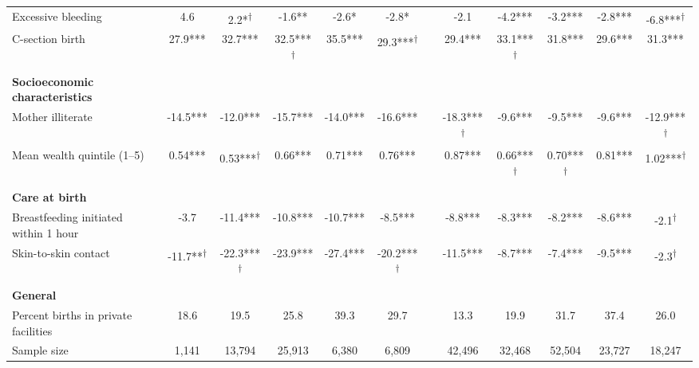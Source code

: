 \begin{tabular}{l*{5}{c}@{\hspace{1.4em}}c@{\hspace{1.4em}}*{5}{c}}
\hspace*{2em}Excessive bleeding&4.6&2.2*\textsuperscript{\(\dagger\)}&-1.6**&-2.6*&-2.8*&&-2.1&-4.2***&-3.2***&-2.8***&-6.8***\textsuperscript{\(\dagger\)}\\
\hspace*{2em}C-section birth&27.9***&32.7***&32.5***\textsuperscript{\(\dagger\)}&35.5***&29.3***\textsuperscript{\(\dagger\)}&&29.4***&33.1***\textsuperscript{\(\dagger\)}&31.8***&29.6***&31.3***\\
&&&&&&&&&&&\\
\textbf{Socioeconomic characteristics}&&&&&&&&&&&\\
\hspace*{2em}Mother illiterate&-14.5***&-12.0***&-15.7***&-14.0***&-16.6***&&-18.3***\textsuperscript{\(\dagger\)}&-9.6***&-9.5***&-9.6***&-12.9***\textsuperscript{\(\dagger\)}\\
\hspace*{2em}Mean wealth quintile (1--5)&0.54***&0.53***\textsuperscript{\(\dagger\)}&0.66***&0.71***&0.76***&&0.87***&0.66***\textsuperscript{\(\dagger\)}&0.70***\textsuperscript{\(\dagger\)}&0.81***&1.02***\textsuperscript{\(\dagger\)}\\
&&&&&&&&&&&\\
\textbf{Care at birth}&&&&&&&&&&&\\
\hspace*{2em}Breastfeeding initiated within 1 hour&-3.7&-11.4***&-10.8***&-10.7***&-8.5***&&-8.8***&-8.3***&-8.2***&-8.6***&-2.1\textsuperscript{\(\dagger\)}\\
\hspace*{2em}Skin-to-skin contact&-11.7**\textsuperscript{\(\dagger\)}&-22.3***\textsuperscript{\(\dagger\)}&-23.9***&-27.4***&-20.2***\textsuperscript{\(\dagger\)}&&-11.5***&-8.7***&-7.4***&-9.5***&-2.3\textsuperscript{\(\dagger\)}\\
&&&&&&&&&&&\\
\textbf{General}&&&&&&&&&&&\\
\hspace*{2em}Percent births in private facilities&18.6&19.5&25.8&39.3&29.7&&13.3&19.9&31.7&37.4&26.0\\
\hspace*{2em}Sample size&1,141&13,794&25,913&6,380&6,809&&42,496&32,468&52,504&23,727&18,247\\
\bottomrule
\end{tabular}
